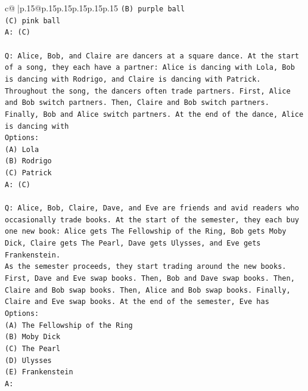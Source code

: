 \documentclass{article}
\begin{document}
{\begin{supertabular}{c@{$\;$}|p{.15\linewidth}@{}p{.15\linewidth}p{.15\linewidth}p{.15\linewidth}p{.15\linewidth}p{.15\linewidth}}
{{{\texttt{(B) purple ball} \\
\texttt{(C) pink ball} \\
\texttt{A: (C)} \\
\\ 
\texttt{Q: Alice, Bob, and Claire are dancers at a square dance. At the start of a song, they each have a partner: Alice is dancing with Lola, Bob is dancing with Rodrigo, and Claire is dancing with Patrick.} \\
\texttt{Throughout the song, the dancers often trade partners. First, Alice and Bob switch partners. Then, Claire and Bob switch partners. Finally, Bob and Alice switch partners. At the end of the dance, Alice is dancing with} \\
\texttt{Options:} \\
\texttt{(A) Lola} \\
\texttt{(B) Rodrigo} \\
\texttt{(C) Patrick} \\
\texttt{A: (C)} \\
\\ 
\texttt{Q: Alice, Bob, Claire, Dave, and Eve are friends and avid readers who occasionally trade books. At the start of the semester, they each buy one new book: Alice gets The Fellowship of the Ring, Bob gets Moby Dick, Claire gets The Pearl, Dave gets Ulysses, and Eve gets Frankenstein.} \\
\texttt{As the semester proceeds, they start trading around the new books. First, Dave and Eve swap books. Then, Bob and Dave swap books. Then, Claire and Bob swap books. Then, Alice and Bob swap books. Finally, Claire and Eve swap books. At the end of the semester, Eve has} \\
\texttt{Options:} \\
\texttt{(A) The Fellowship of the Ring} \\
\texttt{(B) Moby Dick} \\
\texttt{(C) The Pearl} \\
\texttt{(D) Ulysses} \\
\texttt{(E) Frankenstein} \\
\texttt{A:} \\
            }
        }
    }
     \\ \\


\end{supertabular}}
\end{document}

